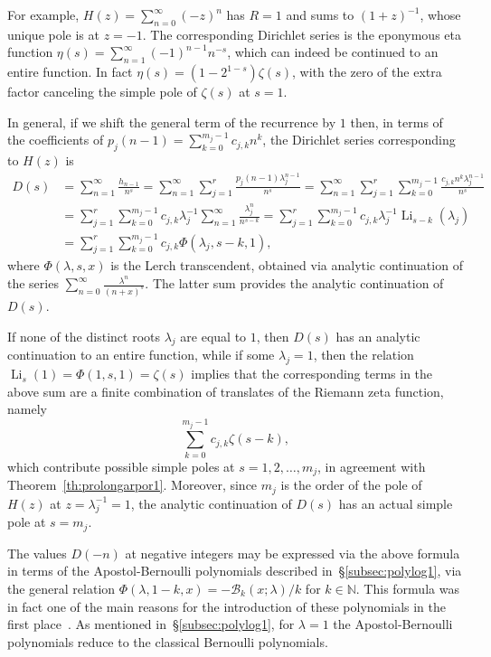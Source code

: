 \documentclass[11pt,a4paper]{amsart}
\newcommand{\N}{\mathbb{N}}
\newcommand{\AB}{\mathcal{B}}
\newcommand{\Li}{\operatorname{Li}}
\theoremstyle{plain}
\theoremstyle{plain}
\theoremstyle{plain}
\theoremstyle{definition}
\theoremstyle{remark}
\begin{document}
For example, $H(z) = \sum_{n=0}^{\infty} (-z)^{n}$ has $R=1$ and sums to $(1+z)^{-1}$, whose unique pole is at $z = -1$. The corresponding Dirichlet series is the eponymous eta function $\eta(s) = \sum_{n=1}^{\infty} (-1)^{n-1} n^{-s}$, which can indeed be continued to an entire function. In fact $\eta(s) = (1-2^{1-s}) \zeta(s)$, with the zero of the extra factor canceling the simple pole of $\zeta(s)$ at $s=1$.


In general, if we shift the general term of the recurrence by $1$ then, in terms of the coefficients of $p_{j}(n-1) = \sum_{k=0}^{m_{j}-1} c_{j,k} n^{k}$, the Dirichlet series corresponding to $H(z)$ is
\begin{align*}
  D(s)
  &= \sum_{n=1}^{\infty} \frac{h_{n-1}}{n^{s}}
  = \sum_{n=1}^{\infty} \sum_{j=1}^{r} \frac{p_{j}(n-1) \lambda_{j}^{n-1}}{n^{s}}
  = \sum_{n=1}^{\infty} \sum_{j=1}^{r} \sum_{k=0}^{m_{j}-1} 
  \frac{c_{j,k} n^{k} \lambda_{j}^{n-1}}{n^{s}}
  \\
  &= \sum_{j=1}^{r} \sum_{k=0}^{m_{j}-1} c_{j,k} \lambda_{j}^{-1} 
  \sum_{n=1}^{\infty}  \frac{\lambda_{j}^{n}}{n^{s-k}}
  = \sum_{j=1}^{r} \sum_{k=0}^{m_{j}-1} c_{j,k} \lambda_{j}^{-1} \Li_{s-k}(\lambda_{j})
  \\
  &= \sum_{j=1}^{r} \sum_{k=0}^{m_{j}-1} c_{j,k} \Phi(\lambda_{j},s-k,1),
\end{align*}
where $\Phi(\lambda,s,x)$ is the Lerch transcendent, obtained via analytic continuation of the series $\sum_{n=0}^{\infty} \frac{\lambda^{n}}{(n+x)^{s}}$. The latter sum provides the analytic continuation of $D(s)$.

If none of the distinct roots $\lambda_{j}$ are equal to $1$, then $D(s)$ has an analytic continuation to an entire function, while if some $\lambda_{j} = 1$, then the relation $\Li_{s}(1) = \Phi(1,s,1) = \zeta(s)$ implies that the corresponding terms in the above sum are a finite combination of translates of the Riemann zeta function, namely
\[
  \sum_{k=0}^{m_{j}-1} c_{j,k} \zeta(s-k),
\]
which contribute possible simple poles at $s=1,2,\dots,m_{j}$, in agreement with Theorem~\ref{th:prolongarpor1}. Moreover, since $m_{j}$ is the order of the pole of $H(z)$ at $z = \lambda_{j}^{-1} = 1$, the analytic continuation of $D(s)$ has an actual simple pole at $s = m_{j}$.

The values $D(-n)$ at negative integers may be expressed via the above formula in terms of the Apostol-Bernoulli polynomials described in~\S\ref{subsec:polylog1}, via the general relation $\Phi(\lambda,1-k,x) = -\AB_{k}(x;\lambda)/k$ for $k \in \N$. This formula was in fact one of the main reasons for the introduction of these polynomials in the first place~\cite{Apostol-Lerch}. As mentioned in~\S\ref{subsec:polylog1}, for $\lambda = 1$ the  Apostol-Bernoulli polynomials reduce to the classical Bernoulli polynomials.
\end{document}
